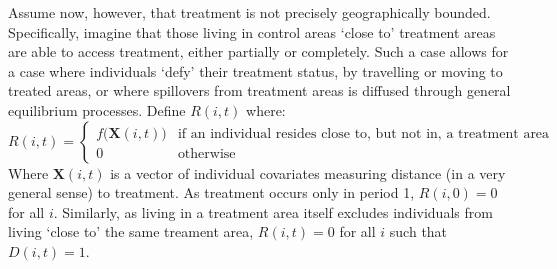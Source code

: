 Assume now, however, that treatment is not precisely geographically bounded.  
Specifically, imagine that those living in control areas `close to' treatment 
areas are able to access treatment, either partially or completely.  Such a 
case allows for a case where individuals `defy' their treatment status, by 
travelling or moving to treated areas, or where spillovers from treatment 
areas is diffused through general equilibrium processes.  Define $R(i,t)$ 
where:
\begin{equation}
\nonumber
 R(i,t) =
  \begin{cases}
   f\Big(\mathbf{X}(i,t)\Big)   & \text{if an individual resides close to, but not in, a treatment area} \\
   0                            & \text{otherwise} 
  \end{cases}
\end{equation}
Where $\mathbf{X}(i,t)$ is a vector of individual covariates measuring 
distance (in a very general sense) to treatment. As treatment occurs only in 
period 1, $R(i,0)=0$ for all $i$.  Similarly, as living in a treatment area 
itself excludes individuals from living `close to' the same treament area, 
$R(i,t)=0$ for all $i$ such that $D(i,t)=1$.

